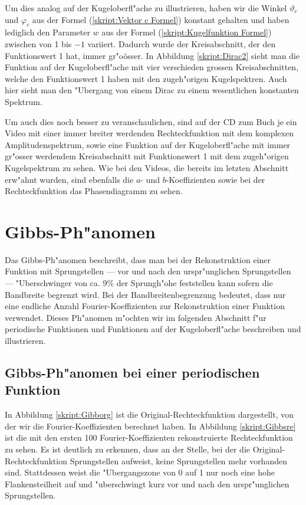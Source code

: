 \begin{refsection}
Um dies analog auf der Kugeloberfl"ache zu illustrieren, haben 
wir die Winkel $\vartheta_c$ und $\varphi_c$ aus der Formel 
(\ref{skript:Vektor c Formel}) konstant  gehalten und haben lediglich 
den Parameter $w$ aus der Formel (\ref{skript:Kugelfunktion Formel}) 
zwischen von 1 bis $-1$ variiert. 
Dadurch wurde der Kreisabschnitt, der den Funktionswert 1 hat, immer 
gr"oösser. 
In Abbildung \ref{skript:Dirac2} sieht man die Funktion auf der 
Kugeloberfl"ache mit vier verschieden grossen Kreisabschnitten, welche 
den Funktionswert 1 haben mit den zugeh"origen Kugelspektren. Auch
hier sieht man den "Ubergang von einem Dirac zu einem wesentlichen 
konstanten Spektrum.

Um auch dies noch besser zu veranschaulichen, sind auf der CD zum Buch 
je ein Video mit einer immer breiter werdenden Rechteckfunktion mit dem 
komplexen Amplitudenspektrum, sowie eine Funktion auf der 
Kugeloberfl"ache mit immer gr"osser werdendem Kreisabschnitt mit 
Funktionswert 1 mit dem zugeh"origen Kugelspektrum zu sehen. 
Wie bei den Videos, die bereits im letzten Abschnitt erw"ahnt wurden, 
sind ebenfalls die $a$- und $b$-Koeffizienten sowie bei der 
Rechteckfunktion das Phasendiagramm zu sehen.


\section{Gibbs-Ph"anomen}
%
Das Gibbs-Ph"anomen beschreibt, dass man bei der Rekonstruktion einer
Funktion mit Sprungstellen --- vor und nach den urspr"unglichen 
Sprungstellen --- "Uberschwinger von ca. 9\% der Sprungh"ohe feststellen 
kann sofern die Bandbreite begrenzt wird. 
Bei der Bandbreitenbegrenzung bedeutet, dass nur eine endliche Anzahl 
Fourier-Koeffizienten zur Rekonstruktion einer Funktion verwendet. 
Dieses Ph"anomen m"ochten wir im folgenden Abschnitt f"ur periodische 
Funktionen und Funktionen auf der Kugeloberfl"ache beschreiben und 
illustrieren.

\subsection{Gibbs-Ph"anomen bei einer periodischen Funktion}
In Abbildung \ref{skript:Gibborg} ist die Original-Rechteckfunktion 
dargestellt, von der wir die Fourier-Koeffizienten berechnet haben. 
In Abbildung \ref{skript:Gibbsre} ist die mit den ersten 100 
Fourier-Koeffizienten rekonstruierte Rechteckfunktion zu sehen. 
Es ist deutlich zu erkennen, dass an der Stelle, bei der die 
Original-Rechteckfunktion Sprungstellen aufweist, keine Sprungstellen 
mehr vorhanden sind. 
Stattdessen weist die "Ubergangszone von 0 auf 1 nur noch eine hohe 
Flankensteilheit auf und "uberschwingt kurz vor und nach den 
urspr"unglichen Sprungstellen.


\end{refsection}
